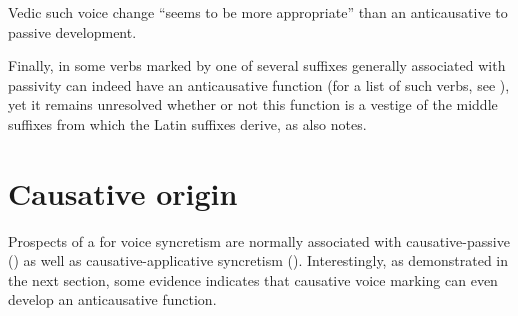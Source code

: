 Vedic  such voice change “seems to be more appropriate” than an anticausative to passive development.

Finally, in  some verbs marked by one of several suffixes generally associated with passivity can indeed have an anticausative function (for a list of such verbs, see \citealt[227]{miller:d:g:1993}), yet it remains unresolved whether or not this function is a vestige of the  middle suffixes from which the Latin suffixes derive, as \cite[247]{kulikov:2011b} also notes. 

\section{Causative origin} \label{diachrony:causative}
Prospects of a  for voice syncretism are normally associated with causative-passive () as well as causative-applicative syncretism (). Interestingly, as demonstrated in the next section, some evidence indicates that causative voice marking can even develop an anticausative function.

